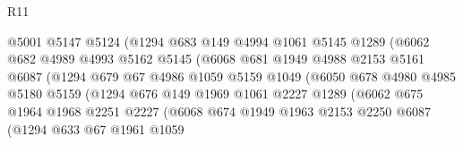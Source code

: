 \begin{lexlean}{R11}
\begin{coremodule}
                            @5001
                            @5147
                            @5124
                            (@1294
                              @683
                              @149
                              @4994
                              @1061
                              @5145
                              @1289
                              (@6062
                                @682
                                @4989
                                @4993
                                @5162
                                @5145
                                (@6068
                                  @681
                                  @1949
                                  @4988
                                  @2153
                                  @5161
                                  @6087
                                  (@1294
                                    @679
                                    @67
                                    @4986
                                    @1059
                                    @5159
                                    @1049
                                    (@6050
                                      @678
                                      @4980
                                      @4985
                                      @5180
                                      @5159
                                      (@1294
                                        @676
                                        @149
                                        @1969
                                        @1061
                                        @2227
                                        @1289
                                        (@6062
                                          @675
                                          @1964
                                          @1968
                                          @2251
                                          @2227
                                          (@6068
                                            @674
                                            @1949
                                            @1963
                                            @2153
                                            @2250
                                            @6087
                                            (@1294
                                              @633
                                              @67
                                              @1961
                                              @1059

\end{coremodule}
\end{lexlean}
